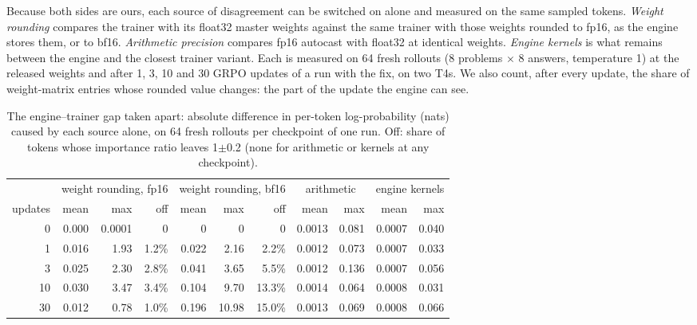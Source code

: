 \documentclass[11pt]{article}
\begin{document}
Because both sides are ours, each source of disagreement can be switched on alone and measured on
the same sampled tokens. \emph{Weight rounding} compares the trainer with its float32 master
weights against the same trainer with those weights rounded to fp16, as the engine stores them, or
to bf16. \emph{Arithmetic precision} compares fp16 autocast with float32 at identical weights.
\emph{Engine kernels} is what remains between the engine and the closest trainer variant. Each is
measured on 64 fresh rollouts (8 problems $\times$ 8 answers, temperature 1) at the released
weights and after 1, 3, 10 and 30 GRPO updates of a run with the fix, on two T4s. We also count,
after every update, the share of weight-matrix entries whose rounded value changes: the part of the
update the engine can see.

\begin{table}[t]
\centering
\small
\begin{tabular}{rrrrrrrrrrr}
\toprule
& \multicolumn{3}{c}{weight rounding, fp16} & \multicolumn{3}{c}{weight rounding, bf16} & \multicolumn{2}{c}{arithmetic} & \multicolumn{2}{c}{engine kernels} \\
\cmidrule(lr){2-4}\cmidrule(lr){5-7}\cmidrule(lr){8-9}\cmidrule(lr){10-11}
updates & mean & max & off & mean & max & off & mean & max & mean & max \\
\midrule
0 & 0.000 & 0.0001 & 0 & 0 & 0 & 0 & 0.0013 & 0.081 & 0.0007 & 0.040 \\
1 & 0.016 & 1.93 & 1.2\% & 0.022 & 2.16 & 2.2\% & 0.0012 & 0.073 & 0.0007 & 0.033 \\
3 & 0.025 & 2.30 & 2.8\% & 0.041 & 3.65 & 5.5\% & 0.0012 & 0.136 & 0.0007 & 0.056 \\
10 & 0.030 & 3.47 & 3.4\% & 0.104 & 9.70 & 13.3\% & 0.0014 & 0.064 & 0.0008 & 0.031 \\
30 & 0.012 & 0.78 & 1.0\% & 0.196 & 10.98 & 15.0\% & 0.0013 & 0.069 & 0.0008 & 0.066 \\
\bottomrule
\end{tabular}
\caption{The engine--trainer gap taken apart: absolute difference in per-token log-probability
(nats) caused by each source alone, on 64 fresh rollouts per checkpoint of one run. Off: share of
tokens whose importance ratio leaves 1$\pm$0.2 (none for arithmetic or kernels at any checkpoint).}
\label{tab:decompose}
\end{table}
\end{document}
